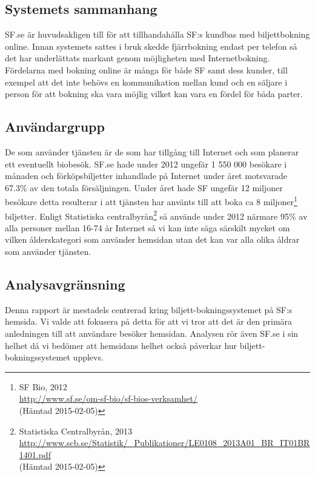 \documentclass[swedish,a4paper,11pt]{article}
\begin{document}
\subsection{Systemets sammanhang} 
SF.se är huvudsakligen till för att tillhandahålla SF:s kundbas med biljettbokning online. Innan systemets sattes i bruk skedde fjärrbokning endast per telefon så det har underlättats markant genom möjligheten med Internetbokning. Fördelarna med bokning online är många för både SF samt dess kunder, till exempel att det inte behövs en kommunikation mellan kund och en säljare i person för att bokning ska vara möjlig vilket kan vara en fördel för båda parter.

\subsection{Användargrupp} 
De som använder tjänsten är de som har tillgång till Internet och som planerar ett eventuellt biobesök. SF.se hade under 2012 ungefär 1 550 000 besökare i månaden och förköpsbiljetter inhandlade på Internet under året motsvarade 67.3\% av den totala försäljningen. Under året hade SF ungefär 12 miljoner besökare detta resulterar i att tjänsten har använts till att boka ca 8 miljoner\footnote{SF Bio, 2012  \\
\url{http://www.sf.se/om-sf-bio/sf-bios-verksamhet/}\\ (Hämtad 2015-02-05)} biljetter. Enligt Statistiska centralbyrån\footnote{ Statistiska Centralbyrån, 2013\\ \url{http://www.scb.se/Statistik/_Publikationer/LE0108_2013A01_BR_IT01BR1401.pdf} \\ (Hämtad 2015-02-05)} så använde under 2012 närmare 95\% av alla personer mellan 16-74 år Internet så vi kan inte säga särskilt mycket om vilken ålderskategori som använder hemsidan utan det kan var alla olika åldrar som använder tjänsten.

\subsection{Analysavgränsning}
Denna rapport är mestadels centrerad kring biljett-bokningssystemet på SF:s hemsida. Vi valde att fokusera på detta för att vi tror att det är den primära anledningen till att användare besöker hemsidan. Analysen rör även SF.se i sin helhet då vi bedömer att hemsidans helhet också påverkar hur biljett-bokningssystemet upplevs.

\newpage
\end{document}
